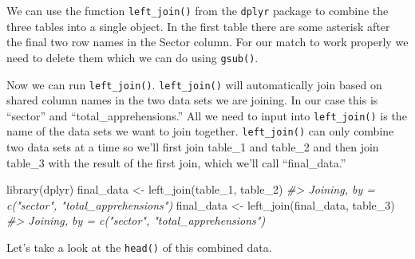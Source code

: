 \documentclass[
]{krantz}
\makeatletter
\newenvironment{Shaded}{\begin{snugshade}}{\end{snugshade}}
\newcommand{\CommentTok}[1]{\textcolor[rgb]{0.37,0.37,0.37}{\textit{#1}}}
\newcommand{\FunctionTok}[1]{\textcolor[rgb]{0,0,0}{#1}}
\newcommand{\NormalTok}[1]{#1}
\newcommand{\OtherTok}[1]{\textcolor[rgb]{0.37,0.37,0.37}{#1}}
\newcommand{\SpecialCharTok}[1]{\textcolor[rgb]{0,0,0}{#1}}
\newcommand{\StringTok}[1]{\textcolor[rgb]{0.5,0.5,0.5}{#1}}
\newenvironment{kframe}{%
\medskip{}
\setlength{\fboxsep}{.8em}
 \def\at@end@of@kframe{}%
 \ifinner\ifhmode%
  \def\at@end@of@kframe{\end{minipage}}%
  \begin{minipage}{\columnwidth}%
 \fi\fi%
 \def\FrameCommand##1{\hskip\@totalleftmargin \hskip-\fboxsep
 \colorbox{shadecolor}{##1}\hskip-\fboxsep
     \hskip-\linewidth \hskip-\@totalleftmargin \hskip\columnwidth}%
 \MakeFramed {\advance\hsize-\width
   \@totalleftmargin\z@ \linewidth\hsize
   \@setminipage}}%
 {\par\unskip\endMakeFramed%
 \at@end@of@kframe}
\renewenvironment{Shaded}{\begin{kframe}}{\end{kframe}}
\makeatother
\begin{document}
We can use the function \texttt{left\_join()} from the \texttt{dplyr} package to combine the three tables into a single object. In the first table there are some asterisk after the final two row names in the Sector column. For our match to work properly we need to delete them which we can do using \texttt{gsub()}.

\begin{Shaded}
\end{Shaded}

Now we can run \texttt{left\_join()}. \texttt{left\_join()} will automatically join based on shared column names in the two data sets we are joining. In our case this is ``sector'' and ``total\_apprehensions.'' All we need to input into \texttt{left\_join()} is the name of the data sets we want to join together. \texttt{left\_join()} can only combine two data sets at a time so we'll first join table\_1 and table\_2 and then join table\_3 with the result of the first join, which we'll call ``final\_data.''

\begin{Shaded}
\begin{Highlighting}[]
\FunctionTok{library}\NormalTok{(dplyr)}
\NormalTok{final\_data }\OtherTok{\textless{}{-}} \FunctionTok{left\_join}\NormalTok{(table\_1, table\_2)}
\CommentTok{\#\textgreater{} Joining, by = c("sector", "total\_apprehensions")}
\NormalTok{final\_data }\OtherTok{\textless{}{-}} \FunctionTok{left\_join}\NormalTok{(final\_data, table\_3)}
\CommentTok{\#\textgreater{} Joining, by = c("sector", "total\_apprehensions")}
\end{Highlighting}
\end{Shaded}

Let's take a look at the \texttt{head()} of this combined data.
\end{document}
